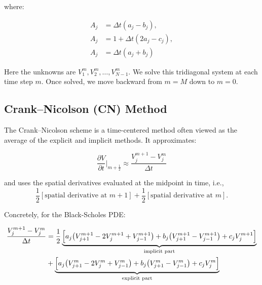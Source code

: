     where:

    \begin{equation*}
        \begin{aligned}
            A_j &= \Delta t \left(a_j - b_j\right), \\
            A_j &= 1 + \Delta t \left(2a_j - c_j\right), \\
            A_j &= \Delta t \left(a_j + b_j\right)
        \end{aligned}
        \label{eq:abc_coeffs}
    \end{equation*}

    Here the unknowns are $V_1^m, V_2^m, \ldots, V_{N-1}^m$.
    We solve this tridiagonal system at each time step $m$.
    Once solved, we move backward from $m = M$ down to $m = 0$.

    \subsection{Crank–Nicolson (CN) Method}
    \label{sec:crank_nicolson}

    The Crank–Nicolson scheme is a time-centered method often viewed as the average of the explicit and implicit methods.
    It approximates:

    \begin{equation}
        \frac{\partial V}{\partial t} \bigg|_{m+\frac{1}{2}} \approx \frac{V_j^{m+1} - V_j^m}{\Delta t}
        \label{eq:cn_approx}
    \end{equation}

    and uses the spatial derivatives evaluated at the midpoint in time, i.e.,
    \begin{equation*}
        \frac{1}{2} \left[\text{spatial derivative at } m+1 \right]
        + \frac{1}{2} \left[\text{spatial derivative at } m\right].
    \end{equation*}

    Concretely, for the Black-Scholes PDE:

    \begin{equation}
        \begin{aligned}
            \frac{V_j^{m+1} - V_j^m}{\Delta t}
            &= \frac{1}{2} \underbrace{
                \Bigl[
                a_j \bigl(V_{j+1}^{m+1} - 2V_j^{m+1} + V_{j-1}^{m+1}\bigr)
                + b_j \bigl(V_{j+1}^{m+1} - V_{j-1}^{m+1}\bigr)
                + c_j V_j^{m+1}
                \Bigr]
            }_{\text{implicit part}} \\
            &+ \underbrace{
                \Bigl[
                a_j \bigl(V_{j+1}^m - 2V_j^m + V_{j-1}^m\bigr)
                + b_j \bigl(V_{j+1}^m - V_{j-1}^m\bigr)
                + c_j V_j^m
                \Bigr]
            }_{\text{explicit part}}
        \end{aligned}
        \label{eq:cn_black_scholes}
    \end{equation}

